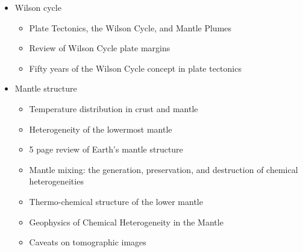 \begin{itemize}
\item Wilson cycle
   \begin{itemize}
   \item [\twothousandeleven] Plate Tectonics, the Wilson Cycle, and Mantle Plumes \cite{burk11}
   \item [\twothousandfourteen] Review of Wilson Cycle plate margins \cite{buto14}
   \item [\twothousandnineteen] Fifty years of the Wilson Cycle concept in plate tectonics \cite{wihb19}
   \end{itemize}

\item Mantle structure
   \begin{itemize}
   \item [\nineteeneightysix] Temperature distribution in crust and mantle \cite{jemo86}
   \item [\twothousand] Heterogeneity of the lowermost mantle \cite{garn00}
   \item [\twothousandone] 5 page review of Earth's mantle structure \cite{hewo01}
   \item [\twothousandtwo] Mantle mixing: the generation, preservation, and destruction of chemical heterogeneities \cite{vahb02}
   \item [\twothousandseven] Thermo-chemical structure of the lower mantle \cite{dett07}
   \item [\twothousandtwelve] Geophysics of Chemical Heterogeneity in the Mantle \cite{stli12}
   \item [\twothousandthirteen] Caveats on tomographic images \cite{fopa13}
   \end{itemize}


\end{itemize}
